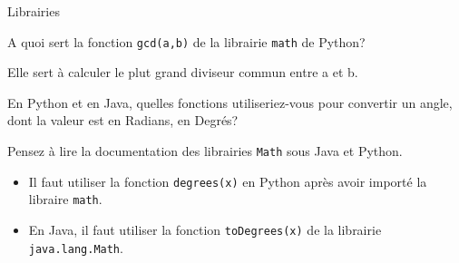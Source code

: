 \begin{section}{Librairies}
\begin{conseil}
\end{conseil} 
\begin{Exercice}[5 minutes]
	A quoi sert la fonction \lstinline{gcd(a,b)} de la librairie \lstinline{math} de Python? 
\end{Exercice} 
\begin{solution}
	Elle sert à calculer le plut grand diviseur commun entre a et b.
\end{solution} 
\begin{Exercice}[5 minutes]
    En Python et en Java, quelles fonctions utiliseriez-vous pour convertir un angle, dont la valeur est en Radians, en Degrés? 
\end{Exercice}
\begin{conseil}
    Pensez à lire la documentation des librairies \lstinline{Math} sous Java et Python.
\end{conseil}
\begin{solution}
    \begin{itemize}
        \item Il faut utiliser la fonction \lstinline{degrees(x)} en Python après avoir importé la libraire \lstinline{math}.
        \item En Java, il faut utiliser la fonction \lstinline{toDegrees(x)} de la librairie \lstinline{java.lang.Math}.
    \end{itemize}


\end{solution}
\end{section}
